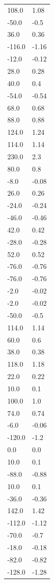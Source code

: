 \begin{longtable}{ll}
108.0 & 1.08 \\
-50.0 & -0.5 \\
36.0 & 0.36 \\
-116.0 & -1.16 \\
-12.0 & -0.12 \\
28.0 & 0.28 \\
40.0 & 0.4 \\
-54.0 & -0.54 \\
68.0 & 0.68 \\
88.0 & 0.88 \\
124.0 & 1.24 \\
114.0 & 1.14 \\
230.0 & 2.3 \\
80.0 & 0.8 \\
-8.0 & -0.08 \\
26.0 & 0.26 \\
-24.0 & -0.24 \\
-46.0 & -0.46 \\
42.0 & 0.42 \\
-28.0 & -0.28 \\
52.0 & 0.52 \\
-76.0 & -0.76 \\
-76.0 & -0.76 \\
-2.0 & -0.02 \\
-2.0 & -0.02 \\
-50.0 & -0.5 \\
114.0 & 1.14 \\
60.0 & 0.6 \\
38.0 & 0.38 \\
118.0 & 1.18 \\
22.0 & 0.22 \\
10.0 & 0.1 \\
100.0 & 1.0 \\
74.0 & 0.74 \\
-6.0 & -0.06 \\
-120.0 & -1.2 \\
0.0 & 0.0 \\
10.0 & 0.1 \\
-88.0 & -0.88 \\
10.0 & 0.1 \\
-36.0 & -0.36 \\
142.0 & 1.42 \\
-112.0 & -1.12 \\
-70.0 & -0.7 \\
-18.0 & -0.18 \\
-82.0 & -0.82 \\
-128.0 & -1.28 \\

\end{longtable}
